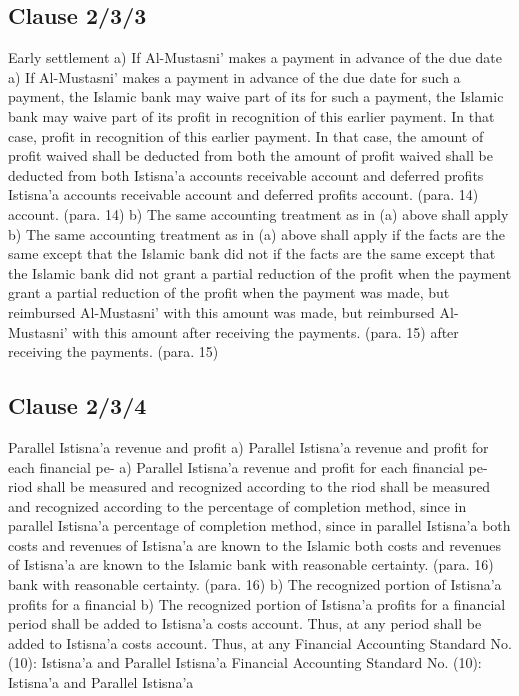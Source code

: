 \documentclass{article}%
\begin{document}
%
\subsection{Clause 2/3/3}%
\label{subsec:Clause2/3/3}%
Early settlement a) If Al-Mustasni’ makes a payment in advance of the due date  a) If Al-Mustasni’ makes a payment in advance of the due date  for such a payment, the Islamic bank may waive part of its  for such a payment, the Islamic bank may waive part of its  profit in recognition of this earlier payment. In that case,  profit in recognition of this earlier payment. In that case,  the amount of profit waived shall be deducted from both  the amount of profit waived shall be deducted from both  Istisna’a accounts receivable account and deferred profits  Istisna’a accounts receivable account and deferred profits  account. (para. 14) account. (para. 14) b) The same accounting treatment as in (a) above shall apply  b) The same accounting treatment as in (a) above shall apply  if the facts are the same except that the Islamic bank did not  if the facts are the same except that the Islamic bank did not  grant a partial reduction of the profit when the payment  grant a partial reduction of the profit when the payment  was made, but reimbursed Al-Mustasni’ with this amount  was made, but reimbursed Al-Mustasni’ with this amount  after receiving the payments. (para. 15) after receiving the payments. (para. 15)

%
\subsection{Clause 2/3/4}%
\label{subsec:Clause2/3/4}%
Parallel Istisna’a revenue and profit a) Parallel Istisna’a revenue and profit for each financial pe- a) Parallel Istisna’a revenue and profit for each financial pe- riod shall be measured and recognized according to the  riod shall be measured and recognized according to the  percentage of completion method, since in parallel Istisna’a  percentage of completion method, since in parallel Istisna’a  both costs and revenues of Istisna’a are known to the Islamic  both costs and revenues of Istisna’a are known to the Islamic  bank with reasonable certainty. (para. 16) bank with reasonable certainty. (para. 16) b) The recognized portion of Istisna’a profits for a financial  b) The recognized portion of Istisna’a profits for a financial  period shall be added to Istisna’a costs account. Thus, at any  period shall be added to Istisna’a costs account. Thus, at any  Financial Accounting Standard No. (10): Istisna’a and Parallel Istisna’a Financial Accounting Standard No. (10): Istisna’a and Parallel Istisna’a
\end{document}
